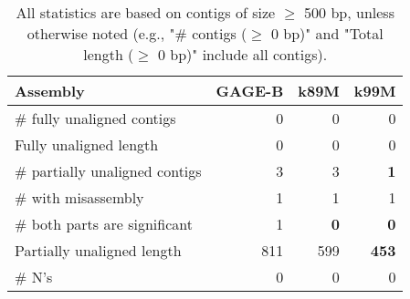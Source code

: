 \documentclass[12pt,a4paper]{article}
\begin{document}
\begin{table}[ht]
\begin{center}
\caption{All statistics are based on contigs of size $\geq$ 500 bp, unless otherwise noted (e.g., "\# contigs ($\geq$ 0 bp)" and "Total length ($\geq$ 0 bp)" include all contigs).}
\begin{tabular}{|l*{3}{|r}|}
\hline
Assembly & GAGE-B & k89M & k99M \\ \hline
\# fully unaligned contigs & 0 & 0 & 0 \\ \hline
Fully unaligned length & 0 & 0 & 0 \\ \hline
\# partially unaligned contigs & 3 & 3 & {\bf 1} \\ \hline
\hspace{5mm}\# with misassembly & 1 & 1 & 1 \\ \hline
\hspace{5mm}\# both parts are significant & 1 & {\bf 0} & {\bf 0} \\ \hline
Partially unaligned length & 811 & 599 & {\bf 453} \\ \hline
\# N's & 0 & 0 & 0 \\ \hline
\end{tabular}
\end{center}
\end{table}
\end{document}
